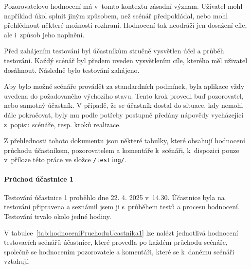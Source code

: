 Pozorovatelovo hodnocení má v~tomto kontextu zásadní význam. 
Uživatel mohl například úkol splnit jiným způsobem, než scénář předpokládal, nebo mohl přehlédnout některé možnosti rozhraní. 
Hodnocení tak neodráží jen dosažení cíle, ale i~způsob jeho naplnění.

Před zahájením testování byl účastníkům stručně vysvětlen účel a průběh testování. 
Každý scénář byl předem uveden vysvětlením cíle, kterého měl uživatel dosáhnout. 
Následně bylo testování zahájeno.

Aby bylo možné scénáře provádět za standardních podmínek, byla aplikace vždy uvedena do požadovaného výchozího stavu. 
Tento krok provedl buď pozorovatel, nebo samotný účastník. 
V případě, že se účastník dostal do situace, kdy nemohl dále pokračovat, byly mu podle potřeby postupně předány nápovědy vycházející z~popisu scénáře, resp. kroků realizace.

Z přehlednosti tohoto dokumentu jsou některé tabulky, které obsahují hodnocení průchodu účastníkem, pozorovatelem a komentáře k~scénáři, k~dispozici pouze v~příloze této práce ve složce \verb|/testing/|.

\paragraph{Průchod účastnice 1}

Testování účastnice 1 proběhlo dne 22. 4. 2025 v~14.30. 
Účastnice byla na testování připravena a seznámil jsem ji s~průběhem testů a procesu hodnocení. 
Testování trvalo okolo jedné hodiny.

V tabulce~\ref{tab:hodnoceniPruchoduUcastnika1} lze nalézt jednotlivá hodnocení testovacích scénářů účastnice, které provedla po každém průchodu scénáře, společně se hodnocením pozorovatele a komentáři, které se k~danému scénáři vztahují.

